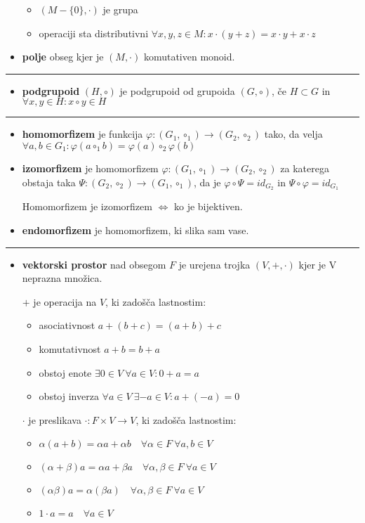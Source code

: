\documentclass[a4paper,8pt]{extarticle}
\begin{document}
\begin{multicols}{3}
\begin{itemize}
\begin{itemize}
        \item $(M-\{0\},\cdot)$ je grupa
        \item operaciji sta distributivni $\forall x,y,z \in M : x\cdot (y+z) = x\cdot y + x \cdot z$
    \end{itemize}
    \item \textbf{polje} obseg kjer je $(M,\cdot)$ komutativen monoid.
\end{itemize}
\noindent\rule{2cm}{0.4pt}
\begin{itemize}
    \item \textbf{podgrupoid} $(H, \circ)$ je podgrupoid od grupoida $(G, \circ)$, če $H \subset G$ in $\forall x,y \in H : x \circ y \in H$
\end{itemize}
\noindent\rule{2cm}{0.4pt}
\begin{itemize}
    \item \textbf{homomorfizem} je funkcija $\varphi : (G_1, \circ_1) \to (G_2, \circ_2)$ tako, da velja $\forall a,b \in G_1 : \varphi (a \circ_1 b) = \varphi (a) \circ_2 \varphi(b)$
    \item \textbf{izomorfizem} je homomorfizem $\varphi : (G_1, \circ_1) \to (G_2, \circ_2)$ za katerega obstaja taka $\Psi : (G_2, \circ_2) \to (G_1, \circ_1)$, da je $\varphi \circ \Psi = id_{G_2}$ in $\Psi \circ \varphi = id_{G_1}$
    
    Homomorfizem je izomorfizem $\Leftrightarrow$ ko je bijektiven.

    \item \textbf{endomorfizem} je homomorfizem, ki slika sam vase.
\end{itemize}
\noindent\rule{2cm}{0.4pt}
\begin{itemize}
    \item \textbf{vektorski prostor} nad obsegom $F$ je urejena trojka $(V, +, \cdot)$ kjer je V neprazna množica.

    $+$ je operacija na $V$, ki zadošča lastnostim:
    \begin{itemize}
        \item asociativnost $a+(b+c) = (a+b)+c$
        \item komutativnost $a+b = b+a$
        \item obstoj enote $\exists 0 \in V \ \forall a \in V : 0+a = a$
        \item obstoj inverza $\forall a \in V \ \exists -a \in V : a+(-a) = 0$
    \end{itemize}
    $\cdot$ je preslikava $\cdot : F\times V \to V$, ki zadošča lastnostim:
    \begin{itemize}
        \item $\alpha (a+b) = \alpha a + \alpha b \quad \forall \alpha \in F \ \forall a,b \in V$
        \item $(\alpha + \beta)a = \alpha a + \beta a \quad \forall \alpha, \beta \in F \ \forall a\in V$
        \item $(\alpha \beta)a = \alpha (\beta a) \quad \forall \alpha, \beta \in F \ \forall a\in V$
        \item $1 \cdot a = a \quad \forall a \in V$
    \end{itemize}


\end{itemize}
\end{multicols}
\end{document}
